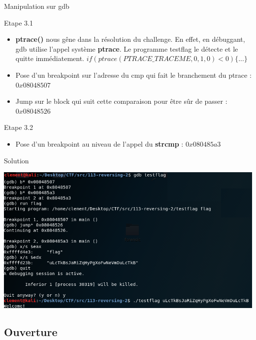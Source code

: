 \documentclass{beamer}
\begin{document}
\begin{frame}{Manipulation sur gdb}
\begin{block}{Etape 3.1}
\begin{itemize}
\item \textbf{ptrace()} nous gêne dans la résolution du challenge. En effet, en débuggant, gdb utilise l'appel système \textbf{ptrace}. Le programme testflag le détecte et le quitte immédiatement. \newline
\tiny{$if (ptrace(PTRACE\_TRACEME, 0, 1, 0) < 0)\{...\}$}
\normalsize\item Pose d'un breakpoint sur l'adresse du cmp qui fait le branchement du ptrace : $0x08048507$
\item Jump sur le block qui suit cette comparaison pour être sûr de passer : $0x08048526$
\end{itemize}
\end{block}
\begin{block}{Etape 3.2}
\begin{itemize}
\item Pose d'un breakpoint au niveau de l'appel du \textbf{strcmp} : $0x080485a3$
\end{itemize}
\end{block}
\end{frame}

\begin{frame}{Solution}
\begin{center}
\includegraphics[scale=0.5]{./pictures/113-reversing-2-gdb-2.PNG}
\end{center}
\end{frame}

\subsection{Ouverture}
\end{document}
